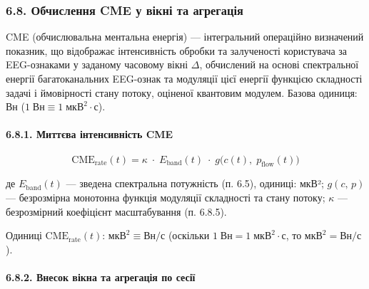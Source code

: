 \documentclass[12pt,a4paper]{article}
\begin{document}
\subsubsection{6.8. Обчислення CME у вікні та агрегація}\label{ux43eux431ux447ux438ux441ux43bux435ux43dux43dux44f-cme-ux443-ux432ux456ux43aux43dux456-ux442ux430-ux430ux433ux440ux435ux433ux430ux446ux456ux44f}



CME (обчислювальна ментальна енергія) --- інтегральний операційно визначений показник, що відображає інтенсивність обробки та залученості користувача за EEG-ознаками у заданому часовому вікні \(\Delta\), обчислений на основі спектральної енергії багатоканальних EEG-ознак та модуляції цієї енергії функцією складності задачі і ймовірності стану потоку, оціненої квантовим модулем. Базова одиниця: Вн (\(1\;\text{Вн} \equiv 1\;\text{мкВ}^2 \cdot \text{с}\)).



\paragraph{6.8.1. Миттєва інтенсивність CME}\label{ux43cux438ux442ux442ux454ux432ux430-ux456ux43dux442ux435ux43dux441ux438ux432ux43dux456ux441ux442ux44c-cme}



\[\boxed{\;\text{CME}_{\text{rate}}(t) = \kappa \;\cdot\; E_{\text{band}}(t) \;\cdot\; g\bigl(c(t),\;p_{\text{flow}}(t)\bigr)\;}\]



де \(E_{\text{band}}(t)\) --- зведена спектральна потужність (п. 6.5), одиниці: мкВ²; \(g(c,\,p)\) --- безрозмірна монотонна функція модуляції складності та стану потоку; \(\kappa\) --- безрозмірний коефіцієнт масштабування (п. 6.8.5).



Одиниці \(\text{CME}_{\text{rate}}(t)\): \(\text{мкВ}^2 \equiv \text{Вн/с}\) (оскільки \(1\;\text{Вн} = 1\;\text{мкВ}^2 \cdot \text{с}\), то \(\text{мкВ}^2 = \text{Вн}/\text{с}\)).



\paragraph{6.8.2. Внесок вікна та агрегація по сесії}\label{ux432ux43dux435ux441ux43eux43a-ux432ux456ux43aux43dux430-ux442ux430-ux430ux433ux440ux435ux433ux430ux446ux456ux44f-ux43fux43e-ux441ux435ux441ux456ux457}
\end{document}
